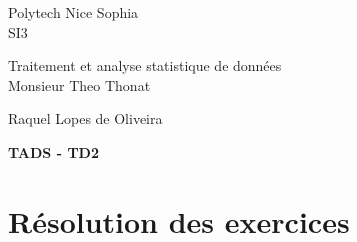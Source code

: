 \documentclass[12pt,a4paper]{article}
\theoremstyle{plain}
\begin{document}
\begin{center}
{\large\sc Polytech Nice Sophia} \\
{\large\sc SI3} \\

\vspace*{0.2cm}

{\sc Traitement et analyse statistique de données} \\
{Monsieur Theo Thonat }

\vspace*{0.2cm}
 Raquel Lopes de Oliveira

\vspace*{0.4cm}

{\large\bf  TADS - TD2 }

\end{center}

%


\section{Résolution des exercices}

%
\newpage

%
\end{document}
